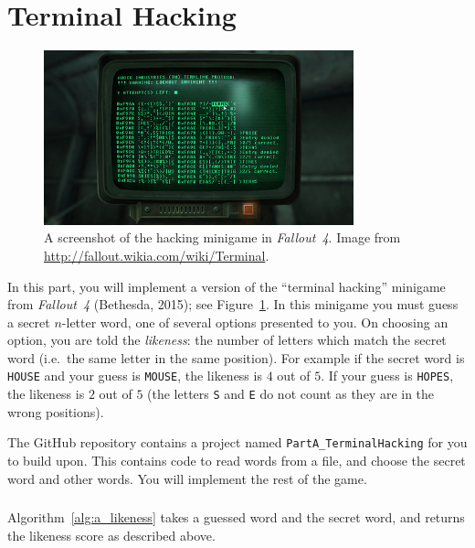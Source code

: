 \part{Terminal Hacking}

\begin{figure}
    \begin{center}
        \includegraphics[width=0.8\textwidth]{fallout_terminal.jpg}
    \end{center}
    \caption{A screenshot of the hacking minigame in \emph{Fallout~4}.
    Image from \protect\url{http://fallout.wikia.com/wiki/Terminal}.}
    \label{fig:fallout_terminal}
\end{figure}

In this part, you will implement a version of the ``terminal hacking'' minigame from \emph{Fallout~4} (Bethesda, 2015); see Figure~\ref{fig:fallout_terminal}.
In this minigame you must guess a secret $n$-letter word, one of several options presented to you.
On choosing an option, you are told the \emph{likeness}: the number of letters which match the secret word (i.e.\ the same letter in the same position).
For example if the secret word is \texttt{HOUSE} and your guess is \texttt{MOUSE}, the likeness is $4$ out of $5$.
If your guess is \texttt{HOPES}, the likeness is $2$ out of $5$ (the letters \texttt{S} and \texttt{E} do not count as they are in the wrong positions).

The GitHub repository contains a project named \texttt{PartA\_TerminalHacking} for you to build upon.
This contains code to read words from a file, and choose the secret word and other words.
You will implement the rest of the game.

\section{} \label{core-a-first}

Algorithm~\ref{alg:a_likeness} takes a guessed word and the secret word, and returns the likeness score as described above.

